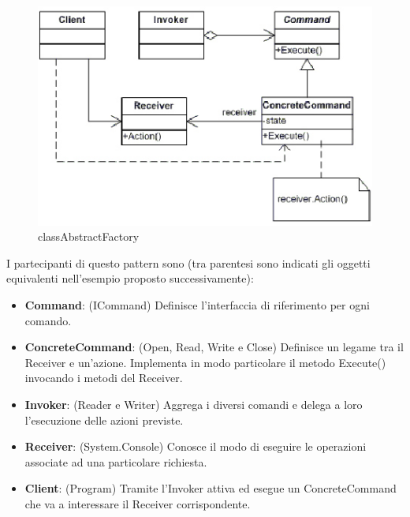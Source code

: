 \documentclass[a4paper,10pt]{article}
\begin{document}
                        \begin{figure}[h!] %
                            \centering
                            \includegraphics[scale=0.50]{img/IC138773}
                            \caption{classAbstractFactory}
                        \end{figure}
                        I partecipanti di questo pattern sono (tra parentesi sono indicati gli oggetti equivalenti nell’esempio proposto successivamente):
                            
                        \begin{itemize}
                            \item \textbf{Command}: (ICommand) Definisce l’interfaccia di riferimento per ogni comando.
                            \item \textbf{ConcreteCommand}: (Open, Read, Write e Close) Definisce un legame tra il Receiver e un’azione. Implementa in modo particolare il metodo Execute() invocando i metodi del Receiver.
                            \item \textbf{Invoker}: (Reader e Writer) Aggrega i diversi comandi e delega a loro l’esecuzione delle azioni previste.
                            \item \textbf{Receiver}: (System.Console) Conosce il modo di eseguire le operazioni associate ad una particolare richiesta.
                            \item \textbf{Client}: (Program) Tramite l’Invoker attiva ed esegue un ConcreteCommand che va a interessare il Receiver corrispondente.
                        \end{itemize}
                        
\end{document}
